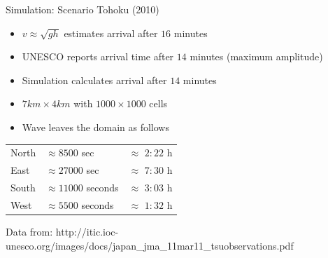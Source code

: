 \documentclass[shortpres]{beamer}
\begin{document}
\begin{frame}{Simulation: Scenario Tohoku (2010)}
		\begin{itemize}
			\item $v \approx \sqrt{gh}$ estimates arrival after $16$ minutes
			\item UNESCO reports arrival time after $14$ minutes (maximum amplitude)
			\item Simulation calculates arrival after $14$ minutes
			\item $7 km \times 4 km$ with $1000 \times 1000$ cells
			\item Wave leaves the domain as follows
		\end{itemize}
		\begin{tabular}{lll}
			North & $\approx 8500$ sec & $\approx$ $2:22$ h\\
			East & $\approx 27000$ sec & $\approx$ $7:30$ h\\
			South & $\approx 11000$ seconds & $\approx$ $3:03$ h\\
			West & $\approx 5500$ seconds & $\approx$ $1:32$ h\\
		\end{tabular}
			
		\vfill
		\flushleft
		{\fontsize{5}{5} \selectfont Data from: http://itic.ioc-unesco.org/images/docs/japan\_jma\_11mar11\_tsuobservations.pdf}	
\end{frame}
\end{document}

